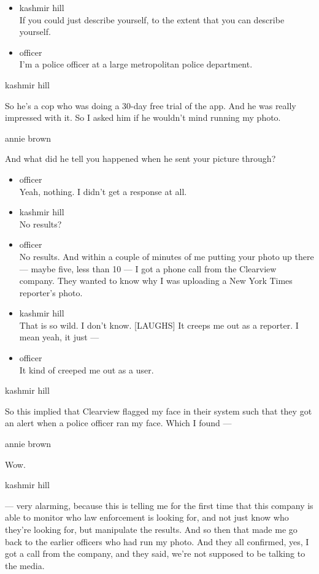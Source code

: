 \begin{itemize}
\item
  kashmir hill\\
  If you could just describe yourself, to the extent that you can
  describe yourself.
\item
  officer\\
  I'm a police officer at a large metropolitan police department.
\end{itemize}

kashmir hill

So he's a cop who was doing a 30-day free trial of the app. And he was
really impressed with it. So I asked him if he wouldn't mind running my
photo.

annie brown

And what did he tell you happened when he sent your picture through?

\begin{itemize}
\item
  officer\\
  Yeah, nothing. I didn't get a response at all.
\item
  kashmir hill\\
  No results?
\item
  officer\\
  No results. And within a couple of minutes of me putting your photo up
  there --- maybe five, less than 10 --- I got a phone call from the
  Clearview company. They wanted to know why I was uploading a New York
  Times reporter's photo.
\item
  kashmir hill\\
  That is so wild. I don't know. {[}LAUGHS{]} It creeps me out as a
  reporter. I mean yeah, it just ---
\item
  officer\\
  It kind of creeped me out as a user.
\end{itemize}

kashmir hill

So this implied that Clearview flagged my face in their system such that
they got an alert when a police officer ran my face. Which I found ---

annie brown

Wow.

kashmir hill

--- very alarming, because this is telling me for the first time that
this company is able to monitor who law enforcement is looking for, and
not just know who they're looking for, but manipulate the results. And
so then that made me go back to the earlier officers who had run my
photo. And they all confirmed, yes, I got a call from the company, and
they said, we're not supposed to be talking to the media.

